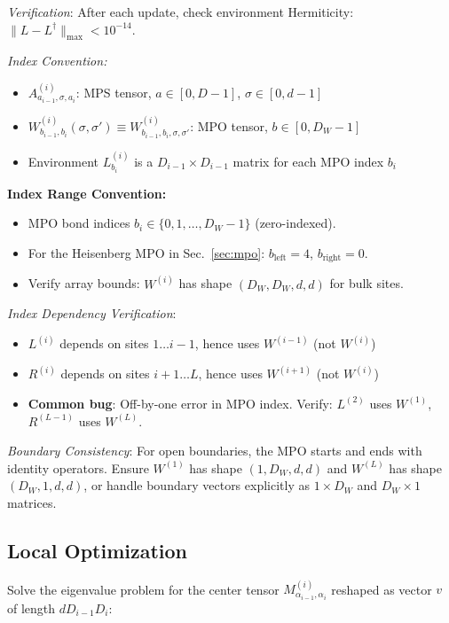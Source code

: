 \documentclass[aps,prb,onecolumn,scriptaddress]{revtex4-2}
\begin{document}
	\textit{Verification}: After each update, check environment Hermiticity: $\|L - L^\dagger\|_{\max} < 10^{-14}$.
	
	
	\textit{Index Convention:} 
	\begin{itemize}
		\item $A^{(i)}_{a_{i-1},\sigma,a_i}$: MPS tensor, $a \in [0,D-1]$, $\sigma \in [0,d-1]$
		\item $W^{(i)}_{b_{i-1},b_i}(\sigma, \sigma') \equiv W^{(i)}_{b_{i-1},b_i,\sigma,\sigma'}$: MPO tensor, $b \in [0,D_W-1]$
		\item Environment $L^{(i)}_{b_i}$ is a $D_{i-1} \times D_{i-1}$ matrix for each MPO index $b_i$
	\end{itemize}
	
	\textbf{Index Range Convention:} 
	\begin{itemize}
		\item MPO bond indices $b_i \in \{0, 1, \dots, D_W-1\}$ (zero-indexed).
		\item For the Heisenberg MPO in Sec.~\ref{sec:mpo}: $b_{\text{left}} = 4$, $b_{\text{right}} = 0$.
		\item Verify array bounds: $W^{(i)}$ has shape $(D_W, D_W, d, d)$ for bulk sites.
	\end{itemize}
	
	\textit{Index Dependency Verification}:
	\begin{itemize}
		\item $L^{(i)}$ depends on sites $1 \dots i-1$, hence uses $W^{(i-1)}$ (not $W^{(i)}$)
		\item $R^{(i)}$ depends on sites $i+1 \dots L$, hence uses $W^{(i+1)}$ (not $W^{(i)}$)  
		\item \textbf{Common bug}: Off-by-one error in MPO index. Verify: $L^{(2)}$ uses $W^{(1)}$, $R^{(L-1)}$ uses $W^{(L)}$.
	\end{itemize}
	\textit{Boundary Consistency}: For open boundaries, the MPO starts and ends with identity operators. Ensure $W^{(1)}$ has shape $(1, D_W, d, d)$ and $W^{(L)}$ has shape $(D_W, 1, d, d)$, or handle boundary vectors explicitly as $1 \times D_W$ and $D_W \times 1$ matrices.
	
	\subsection{Local Optimization}
	Solve the eigenvalue problem for the center tensor $M^{(i)}_{\alpha_{i-1},\alpha_i}$ reshaped as vector $v$ of length $d D_{i-1} D_i$:
	
\end{document}
